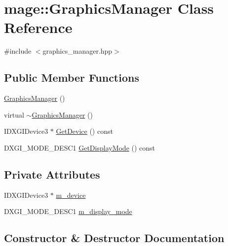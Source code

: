 \hypertarget{classmage_1_1_graphics_manager}{}\section{mage\+:\+:Graphics\+Manager Class Reference}
\label{classmage_1_1_graphics_manager}


{\ttfamily \#include $<$graphics\+\_\+manager.\+hpp$>$}

\subsection*{Public Member Functions}
\begin{DoxyCompactItemize}
\item 
\hyperlink{classmage_1_1_graphics_manager_a2dfecb43107460cc12eb76c77d9dfaa8}{Graphics\+Manager} ()
\item 
virtual \hyperlink{classmage_1_1_graphics_manager_adbf3daeef9b079be665ac22d678ad1a0}{$\sim$\+Graphics\+Manager} ()
\item 
I\+D\+X\+G\+I\+Device3 $\ast$ \hyperlink{classmage_1_1_graphics_manager_a707167960d108ab09a06420182ccfaba}{Get\+Device} () const
\item 
D\+X\+G\+I\+\_\+\+M\+O\+D\+E\+\_\+\+D\+E\+S\+C1 \hyperlink{classmage_1_1_graphics_manager_ac7a14c40d0dd52cb1b76de16c81b42d4}{Get\+Display\+Mode} () const
\end{DoxyCompactItemize}
\subsection*{Private Attributes}
\begin{DoxyCompactItemize}
\item 
I\+D\+X\+G\+I\+Device3 $\ast$ \hyperlink{classmage_1_1_graphics_manager_a81b093270faff50b5f13519cfff5b582}{m\+\_\+device}
\item 
D\+X\+G\+I\+\_\+\+M\+O\+D\+E\+\_\+\+D\+E\+S\+C1 \hyperlink{classmage_1_1_graphics_manager_a005c179f3c0c47487542babde894e752}{m\+\_\+display\+\_\+mode}
\end{DoxyCompactItemize}


\subsection{Constructor \& Destructor Documentation}
\hypertarget{classmage_1_1_graphics_manager_a2dfecb43107460cc12eb76c77d9dfaa8}{}\label{classmage_1_1_graphics_manager_a2dfecb43107460cc12eb76c77d9dfaa8} 
